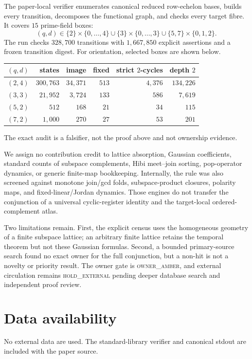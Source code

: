 \documentclass[a4paper,10pt]{amsart}
\theoremstyle{remark}
\begin{document}
The paper-local verifier enumerates canonical reduced row-echelon bases,
builds every transition, decomposes the functional graph, and checks every
target fibre.  It covers $15$ prime-field boxes:
\[
 (q,d)\in\{2\}\!\times\!\{0,\ldots,4\}
 \cup\{3\}\!\times\!\{0,\ldots,3\}
 \cup\{5,7\}\!\times\!\{0,1,2\}.
\]
The run checks $328{,}700$ transitions with $1{,}667{,}850$ explicit
assertions and a frozen transition digest.  For orientation, selected boxes
are shown below.
\begin{center}
\small
\begin{tabular}{rrrrrr}
\toprule
$(q,d)$ & states & image & fixed & strict $2$-cycles & depth $2$ \\
\midrule
$(2,4)$ & $300{,}763$ & $34{,}371$ & $513$ & $4{,}376$ & $134{,}226$ \\
$(3,3)$ & $21{,}952$ & $3{,}724$ & $133$ & $586$ & $7{,}619$ \\
$(5,2)$ & $512$ & $168$ & $21$ & $34$ & $115$ \\
$(7,2)$ & $1{,}000$ & $270$ & $27$ & $53$ & $201$ \\
\bottomrule
\end{tabular}
\end{center}
The exact audit is a falsifier, not the proof above and not ownership evidence.

We assign no contribution credit to lattice absorption, Gaussian
coefficients, standard counts of subspace complements, Hibi meet--join sorting,
pop-operator dynamics, or generic finite-map bookkeeping.  Internally, the
rule was also screened against monotone join/gcd folds, subspace-product
closures, polarity maps, and fixed-linear/Jordan dynamics.  Those engines do
not transfer the conjunction of a universal cyclic-register identity and the
target-local ordered-complement atlas.

Two limitations remain.  First, the explicit census uses the homogeneous
geometry of a finite subspace lattice; an arbitrary finite lattice retains
the temporal theorem but not these Gaussian formulas.  Second, a bounded
primary-source search found no exact owner for the full conjunction, but a
non-hit is not a novelty or priority result.  The owner gate is
\textsc{owner\_amber}, and external circulation remains
\textsc{hold\_external} pending deeper database search and independent proof
review.

\section*{Data availability}
No external data are used.  The standard-library verifier and canonical
stdout are included with the paper source.
\end{document}
